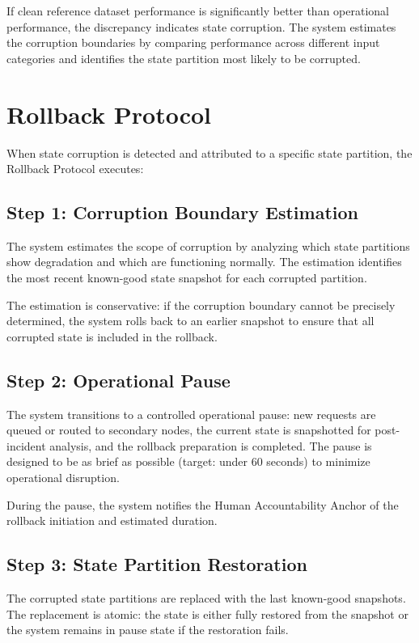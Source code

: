 \documentclass[12pt]{article}
\begin{document}
If clean reference dataset performance is significantly better than operational performance, the discrepancy indicates state corruption. The system estimates the corruption boundaries by comparing performance across different input categories and identifies the state partition most likely to be corrupted.

\section{Rollback Protocol}
When state corruption is detected and attributed to a specific state partition, the Rollback Protocol executes:

\subsection{Step 1: Corruption Boundary Estimation}
The system estimates the scope of corruption by analyzing which state partitions show degradation and which are functioning normally. The estimation identifies the most recent known-good state snapshot for each corrupted partition.

The estimation is conservative: if the corruption boundary cannot be precisely determined, the system rolls back to an earlier snapshot to ensure that all corrupted state is included in the rollback.

\subsection{Step 2: Operational Pause}
The system transitions to a controlled operational pause: new requests are queued or routed to secondary nodes, the current state is snapshotted for post-incident analysis, and the rollback preparation is completed. The pause is designed to be as brief as possible (target: under 60 seconds) to minimize operational disruption.

During the pause, the system notifies the Human Accountability Anchor of the rollback initiation and estimated duration.

\subsection{Step 3: State Partition Restoration}
The corrupted state partitions are replaced with the last known-good snapshots. The replacement is atomic: the state is either fully restored from the snapshot or the system remains in pause state if the restoration fails.
\end{document}
